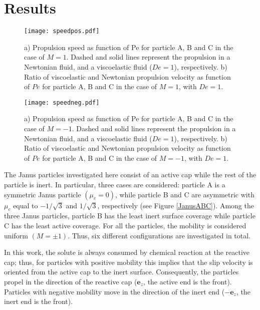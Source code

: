 \documentclass[aps,pre,reprint,twocolumn,notitlepage,superscriptaddress]{revtex4-1}
\begin{document}
\section{Results}
\begin{figure*}[t!]
\centering
        \texttt{[image: speedpos.pdf]}
        \caption{a) Propulsion speed as function of Pe for particle A, B and C in the case of $M=1$. Dashed and solid lines represent the propulsion in a Newtonian fluid, and a viscoelastic fluid ($De=1$), respectively. b) Ratio of viscoelastic and Newtonian propulsion velocity as function of $Pe$ for particle A, B and C in the case of $M=1$, with $De=1$.}
        \label{speedpos}
\end{figure*}

\begin{figure*}[t!]
\centering
        \texttt{[image: speedneg.pdf]}
        \caption{a) Propulsion speed as function of Pe for particle A, B and C in the case of $M=-1$. Dashed and solid lines represent the propulsion in a Newtonian fluid, and a viscoelastic fluid ($De=1$), respectively. b) Ratio of viscoelastic and Newtonian propulsion velocity as function of $Pe$ for particle A, B and C in the case of $M=-1$, with $De=1$.}\label{speedneg}
\end{figure*}

The Janus particles investigated here consist of an active cap while the rest of the particle is inert. In particular, three cases are considered: particle A is a symmetric Janus particle $\left(\mu_{c}=0\right)$, while particle B and C are asymmetric with $\mu_{c}$ equal to $-1/\sqrt{3}$ and $1/\sqrt{3}$, respectively (see Figure \ref{JanusABC}). Among the three Janus particles, particle B has the least inert surface coverage while particle C has the least active coverage. For all the particles, the mobility is considered uniform $\left(M = \pm 1\right)$. Thus, six different configurations are investigated in total.

In this work, the solute is always consumed by chemical reaction at the reactive cap; thus, for particles with positive mobility this implies that the slip velocity is oriented from the active cap to the inert surface. Consequently, the particles propel in the direction of the reactive cap ($\boldsymbol{e}_z$, the active end is the front). Particles with negative mobility move in the direction of the inert end ($-\boldsymbol{e}_z$, the inert end is the front). 
\end{document}
